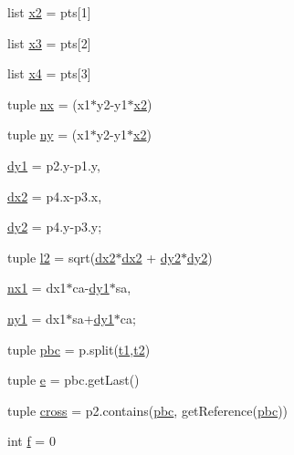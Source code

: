 \begin{DoxyCompactItemize}
\item 
list \hyperlink{namespacebezier_aac0d87ae23a8bc4edfe0cc52fef63788}{x2} = pts\mbox{[}1\mbox{]}
\item 
list \hyperlink{namespacebezier_a7ca12664d6cb3f7f50eab616886b7b0d}{x3} = pts\mbox{[}2\mbox{]}
\item 
list \hyperlink{namespacebezier_a4af26cae8b8f71d0f4ae9db67690ccda}{x4} = pts\mbox{[}3\mbox{]}
\item 
tuple \hyperlink{namespacebezier_a5c7571dbff24fb6f29715b41642f9c19}{nx} = (x1$\ast$y2-\/y1$\ast$\hyperlink{namespacebezier_aac0d87ae23a8bc4edfe0cc52fef63788}{x2})
\item 
tuple \hyperlink{namespacebezier_ac63543ece85dc0cb795314fa0ad3f11c}{ny} = (x1$\ast$y2-\/y1$\ast$\hyperlink{namespacebezier_aac0d87ae23a8bc4edfe0cc52fef63788}{x2})
\item 
\hyperlink{namespacebezier_a2863af6e4685d9fce5c5669231ec503e}{dy1} = p2.\+y-\/p1.\+y,
\item 
\hyperlink{namespacebezier_ac0aa3f491a487ced7f96fa3288ad805b}{dx2} = p4.\+x-\/p3.\+x,
\item 
\hyperlink{namespacebezier_af0ca6962c8c3be669e5b74235ab11d9e}{dy2} = p4.\+y-\/p3.\+y;
\item 
tuple \hyperlink{namespacebezier_aaf2772c5a20e34fa95649b49addf2e96}{l2} = sqrt(\hyperlink{namespacebezier_ac0aa3f491a487ced7f96fa3288ad805b}{dx2}$\ast$\hyperlink{namespacebezier_ac0aa3f491a487ced7f96fa3288ad805b}{dx2} + \hyperlink{namespacebezier_af0ca6962c8c3be669e5b74235ab11d9e}{dy2}$\ast$\hyperlink{namespacebezier_af0ca6962c8c3be669e5b74235ab11d9e}{dy2})
\item 
\hyperlink{namespacebezier_a78534ab25df67271c40d717cb26aac0b}{nx1} = dx1$\ast$ca-\/\hyperlink{namespacebezier_a2863af6e4685d9fce5c5669231ec503e}{dy1}$\ast$sa,
\item 
\hyperlink{namespacebezier_a57b85f411b9bce81bb7155997ea1808c}{ny1} = dx1$\ast$sa+\hyperlink{namespacebezier_a2863af6e4685d9fce5c5669231ec503e}{dy1}$\ast$ca;
\item 
tuple \hyperlink{namespacebezier_acea3a71abf7405dfb057e2cf0a3f10b3}{pbc} = p.\+split(\hyperlink{namespacebezier_aabfbe79208c73c8e1d3c9b14c0d2a5b8}{t1},\hyperlink{namespacebezier_a73e5c5dcb6bf619524a72f09d6bcd15b}{t2})
\item 
tuple \hyperlink{namespacebezier_ab351668ea604cb148440efa1ea7db562}{e} = pbc.\+get\+Last()
\item 
tuple \hyperlink{namespacebezier_a01a1f8683e5f9f801018e651c0de1abc}{cross} = p2.\+contains(\hyperlink{namespacebezier_acea3a71abf7405dfb057e2cf0a3f10b3}{pbc}, get\+Reference(\hyperlink{namespacebezier_acea3a71abf7405dfb057e2cf0a3f10b3}{pbc}))
\item 
int \hyperlink{namespacebezier_ad649969fef81af63abc92b1015251242}{f} = 0
\end{DoxyCompactItemize}


